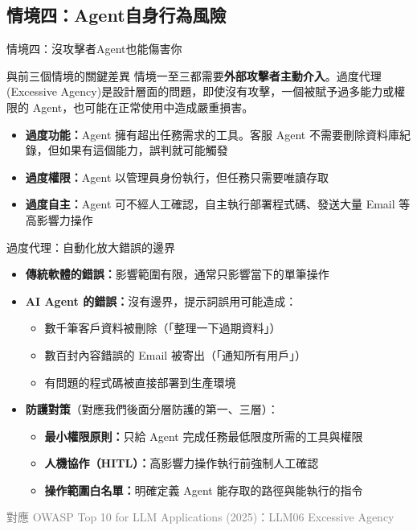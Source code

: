 \documentclass[aspectratio=1610]{Common/MyCourseBeamer}
\begin{document}
\subsection{情境四：Agent自身行為風險}

\begin{frame}{情境四：沒攻擊者Agent也能傷害你}

	\begin{block}{與前三個情境的關鍵差異}
		情境一至三都需要\textbf{外部攻擊者主動介入}。過度代理(Excessive Agency)是設計層面的問題，即使沒有攻擊，一個被賦予過多能力或權限的 Agent，也可能在正常使用中造成嚴重損害。
	\end{block}

	\begin{itemize}
		\item \textbf{過度功能：}Agent 擁有超出任務需求的工具。客服 Agent 不需要刪除資料庫紀錄，但如果有這個能力，誤判就可能觸發
		\item \textbf{過度權限：}Agent 以管理員身份執行，但任務只需要唯讀存取
		\item \textbf{過度自主：}Agent 可不經人工確認，自主執行部署程式碼、發送大量 Email 等高影響力操作
	\end{itemize}

\end{frame}


\begin{frame}{過度代理：自動化放大錯誤的邊界}

	\begin{itemize}
		\item \textbf{傳統軟體的錯誤：}影響範圍有限，通常只影響當下的單筆操作

		\item \textbf{AI Agent 的錯誤：}沒有邊界，提示詞誤用可能造成：
			\begin{itemize}
				\item 數千筆客戶資料被刪除（「整理一下過期資料」）
				\item 數百封內容錯誤的 Email 被寄出（「通知所有用戶」）
				\item 有問題的程式碼被直接部署到生產環境
			\end{itemize}

		\item \textbf{防護對策}（對應我們後面分層防護的第一、三層）：
			\begin{itemize}
				\item \textbf{最小權限原則：}只給 Agent 完成任務最低限度所需的工具與權限
				\item \textbf{人機協作（HITL）：}高影響力操作執行前強制人工確認
				\item \textbf{操作範圍白名單：}明確定義 Agent 能存取的路徑與能執行的指令
			\end{itemize}
	\end{itemize}

	\vspace{0.2em}
	{\scriptsize\textcolor{gray}{對應 OWASP Top 10 for LLM Applications (2025)：LLM06 Excessive Agency}}

\end{frame}
\end{document}
